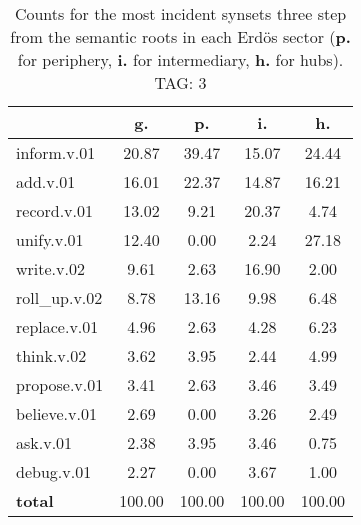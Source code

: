 \begin{table}[h!]
\begin{center}
\begin{tabular}{| l | c | c | c | c |}\hline
 & g. & p. & i. & h. \\\hline
inform.v.01 & 20.87  & 39.47  & 15.07  & 24.44 \\\hline
add.v.01 & 16.01  & 22.37  & 14.87  & 16.21 \\\hline
record.v.01 & 13.02  & 9.21  & 20.37  & 4.74 \\\hline
unify.v.01 & 12.40  & 0.00  & 2.24  & 27.18 \\\hline
write.v.02 & 9.61  & 2.63  & 16.90  & 2.00 \\\hline
roll\_up.v.02 & 8.78  & 13.16  & 9.98  & 6.48 \\\hline
replace.v.01 & 4.96  & 2.63  & 4.28  & 6.23 \\\hline
think.v.02 & 3.62  & 3.95  & 2.44  & 4.99 \\\hline
propose.v.01 & 3.41  & 2.63  & 3.46  & 3.49 \\\hline
believe.v.01 & 2.69  & 0.00  & 3.26  & 2.49 \\\hline
ask.v.01 & 2.38  & 3.95  & 3.46  & 0.75 \\\hline
debug.v.01 & 2.27  & 0.00  & 3.67  & 1.00 \\\hline
{{\bf total}} & 100.00  & 100.00  & 100.00  & 100.00 \\\hline
\end{tabular}
\caption{Counts for the most incident synsets three step from the semantic roots in each Erd\"os sector ({\bf p.} for periphery, {\bf i.} for intermediary, {\bf h.} for hubs). TAG: 3}
\end{center}
\end{table}
